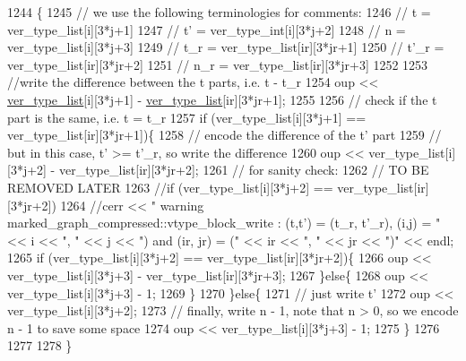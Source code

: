 \begin{DoxyCode}
1244                                                                                             \{
1245   \textcolor{comment}{// we use the following terminologies for comments:}
1246   \textcolor{comment}{// t = ver\_type\_list[i][3*j+1]}
1247   \textcolor{comment}{// t' = ver\_type\_int[i][3*j+2]}
1248   \textcolor{comment}{// n = ver\_type\_list[i][3*j+3]}
1249   \textcolor{comment}{// t\_r = ver\_type\_list[ir][3*jr+1]}
1250   \textcolor{comment}{// t'\_r = ver\_type\_list[ir][3*jr+2]}
1251   \textcolor{comment}{// n\_r = ver\_type\_list[ir][3*jr+3]}
1252 
1253   \textcolor{comment}{//write the difference between the t parts, i.e. t - t\_r}
1254   oup << \hyperlink{classmarked__graph__compressed_af2e3e55223d436628a02758dfae88493}{ver\_type\_list}[i][3*j+1] - \hyperlink{classmarked__graph__compressed_af2e3e55223d436628a02758dfae88493}{ver\_type\_list}[ir][3*jr+1];
1255 
1256   \textcolor{comment}{// check if the t part is the same, i.e. t = t\_r}
1257   \textcolor{keywordflow}{if} (ver\_type\_list[i][3*j+1] == ver\_type\_list[ir][3*jr+1])\{
1258     \textcolor{comment}{// encode the difference of the t' part}
1259     \textcolor{comment}{// but in this case, t' >= t'\_r, so write the difference}
1260     oup << ver\_type\_list[i][3*j+2] - ver\_type\_list[ir][3*jr+2];
1261     \textcolor{comment}{// for sanity check:}
1262     \textcolor{comment}{// TO BE REMOVED LATER}
1263     \textcolor{comment}{//if (ver\_type\_list[i][3*j+2] == ver\_type\_list[ir][3*jr+2])}
1264     \textcolor{comment}{//cerr << " warning marked\_graph\_compressed::vtype\_block\_write : (t,t') = (t\_r, t'\_r), (i,j) = " << i
       << ", " << j << ") and (ir, jr) = (" << ir << ", " << jr << ")" << endl;}
1265     \textcolor{keywordflow}{if} (ver\_type\_list[i][3*j+2] == ver\_type\_list[ir][3*jr+2])\{
1266       oup << ver\_type\_list[i][3*j+3] - ver\_type\_list[ir][3*jr+3];
1267     \}\textcolor{keywordflow}{else}\{
1268       oup << ver\_type\_list[i][3*j+3] - 1;
1269     \}
1270   \}\textcolor{keywordflow}{else}\{
1271     \textcolor{comment}{// just write t'}
1272     oup << ver\_type\_list[i][3*j+2];
1273     \textcolor{comment}{// finally, write n - 1, note that n > 0, so we encode n - 1 to save some space}
1274     oup << ver\_type\_list[i][3*j+3] - 1;
1275   \}
1276 
1277   
1278 \}
\end{DoxyCode}
\mbox{\label{classmarked__graph__compressed_af29f16cbd56583652118eb24a7c233b7}} 
